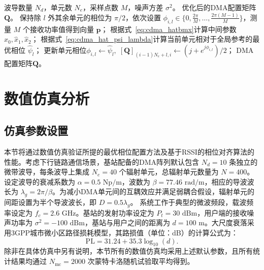 \begin{algorithm}[!t]
	\caption{基于RSSI的非迭代逐元素相位对齐算法（NI-REPA）}
	\label{alg:cdma_ni_repa}
	\begin{algorithmic}[1]
		\REQUIRE 波导数量 $N_d$，单元数 $N_e$，采样点数 $M$，噪声方差 $\sigma^2$。
		\ENSURE 优化后的DMA配置矩阵$\bm{Q}$。
		\STATE 保持除 $l$ 外其余单元的相位为 $\pi/2$，依次设置 $\phi_{i,l} \in \{0, \frac{2\pi}{M}, \dots, \frac{2\pi(M-1)}{M}\}$，测量 $M$ 个接收功率值得到向量 $\bm p$；
		\STATE 根据式~\eqref{eq:cdma_hatbmx}计算中间参数 $\hat{x}_0, \hat{x}_1, \hat{x}_2$；
		\STATE 根据式~\eqref{eq:cdma_hat_psi_lambda}计算当前单元相对于全局参考的最优相位 $\hat{\psi}_l$；
		\ENDFOR
		\STATE 更新单元相位$\phi_{i,l} \leftarrow \hat{\psi}_l,\;[\bm Q]_{(i-1)N_e+l,i}\leftarrow (j+e^{j\phi_{i,l}})/2$；
		\ENDFOR
		\ENDFOR
		\RETURN DMA配置矩阵$\bm{Q}$。
	\end{algorithmic}
\end{algorithm}


\section{数值仿真分析}\label{sec:cdma_sim}

\subsection{仿真参数设置}

本节将通过数值仿真验证所提的最优相位配置方法及基于RSSI的相位对齐算法的性能。考虑下行链路通信场景，基站配备的DMA阵列默认包含 $N_d = 10$ 条独立的微带波导，每条波导上集成 $N_e = 40$ 个辐射单元，总辐射单元数量为 $N = 400$。设定波导的衰减系数为 $\alpha = 0.5 \text{ Np/m}$，波数为 $\beta = 77.46 \text{ rad/m}$，相应的导波波长为 $\lambda_g = 2\pi/\beta$\cite{li2022digital}。为减小DMA单元间的互耦效应并满足弱耦合假设，辐射单元的间距设置为半个导波波长，即 $D = 0.5 \lambda_g$。
系统工作于典型的微波频段，载波频率设定为 $f_c = 2.6 \text{ GHz}$。基站的发射功率设定为 $P_t = 30 \text{ dBm}$，用户端的接收噪声功率为 $\sigma^2 = -100 \text{ dBm}$，基站与用户之间的距离为 $d = 100 \text{ m}$。大尺度衰落采用3GPP城市微小区路径损耗模型，其路损值（单位：dB）的计算公式为：
\begin{equation}
	\mathrm{PL} = 31.24 + 35.3 \log_{10}(d).
\end{equation}
除非在具体仿真中另有说明，本节所有的数值仿真均采用上述默认参数，且所有统计结果均通过 $N_{\mathrm{mc}} = 2000$ 次蒙特卡洛随机试验取平均得到。


